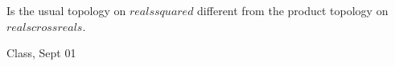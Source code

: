 \begin{samepage}
\begin{ex}
Is the usual topology on $reals squared$ different from the product topology on $reals cross reals$.
\end{ex}
\begin{source}
Class, Sept 01
\end{source}
\end{samepage}
